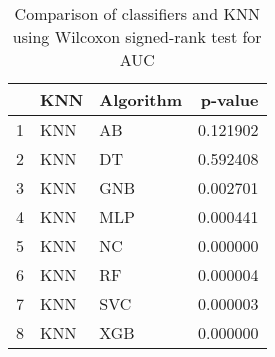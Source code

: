\begin{table}
\footnotesize
\caption{Comparison of classifiers and KNN using Wilcoxon signed-rank test for AUC}
\label{tab:KNN wilcoxon AUC comparison}
\begin{tabular}{lllr}
\hline
 & KNN & Algorithm & p-value \\
\hline
1 & KNN & AB & 0.121902 \\
2 & KNN & DT & 0.592408 \\
3 & KNN & GNB & 0.002701 \\
4 & KNN & MLP & 0.000441 \\
5 & KNN & NC & 0.000000 \\
6 & KNN & RF & 0.000004 \\
7 & KNN & SVC & 0.000003 \\
8 & KNN & XGB & 0.000000 \\
\hline
\end{tabular}
\end{table}
